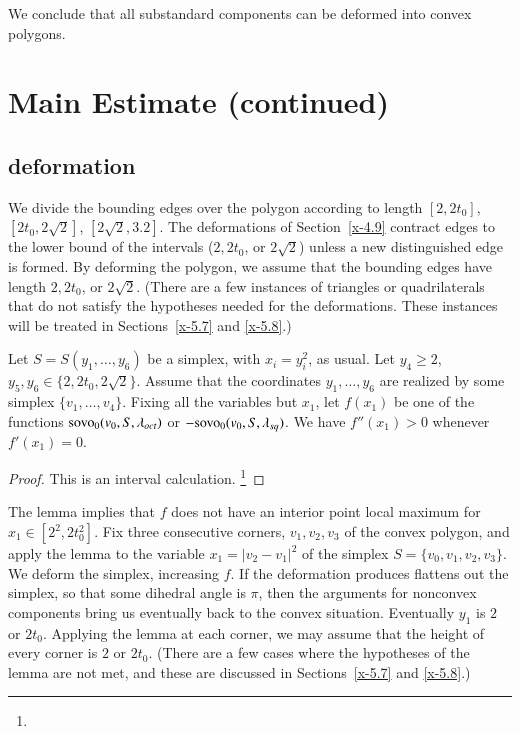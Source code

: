 We conclude that all substandard components can be deformed into convex polygons.





\section{Main Estimate (continued)}%

\subsection{deformation} %
We divide the bounding edges over the polygon according to length
$[2,2t_0]$, $[2t_0,2\sqrt{2}]$, $[2\sqrt{2},3.2]$. The deformations of
Section~\ref{x-4.9} contract edges to the lower bound of the intervals
($2,2t_0$, or $2\sqrt{2}$) unless a new distinguished edge is formed. By
deforming the polygon, we assume that the bounding edges have length
$2,2t_0$, or $2\sqrt{2}$. (There are a few instances of triangles or
quadrilaterals that do not satisfy the hypotheses needed for the
deformations. These instances will be treated in Sections~\ref{x-5.7}
and \ref{x-5.8}.)

\begin{lemma}
Let $S=S(y_1,\ldots,y_6)$ be a simplex, with $x_i=y_i^2$,
as usual.  Let $y_4\ge 2$,
    $y_5,y_6\in\{2,2t_0,2\sqrt{2}\}$.
Assume that the coordinates $y_1,\ldots,y_6$ are realized by
some simplex $\{v_1,\ldots,v_4\}$.  %
Fixing all the variables but $x_1$, let $f(x_1)$ be one of the
functions ${\operatorname{sovo}}_0(v_0,S,\lambda_{oct})$ or 
$-{\operatorname{sovo}}_0(v_0,S,\lambda_{sq})$. We have $f''(x_1)>0$
whenever $f'(x_1)=0$.
\end{lemma}

\begin{proof} This is an interval calculation.%
\footnote{} %
\end{proof}



The lemma implies that $f$ does not have an interior point local maximum
for $x_1\in[2^2,2t_0^2]$.  Fix three consecutive corners, $v_1,v_2,v_3$
of the convex polygon, and apply the lemma to the variable $x_1 =
|v_2-v_1|^2$ of the simplex $S=\{v_0,v_1,v_2,v_3\}$. We deform the simplex,
increasing $f$.  If the deformation produces flattens out the simplex, 
so that some
dihedral angle is $\pi$, then the arguments for nonconvex components bring
us eventually back to the convex situation. Eventually $y_1$ is $2$ or
$2t_0$.  Applying the lemma at each corner, we may assume that the
height of every corner is $2$ or $2t_0$.   (There are a few cases where
the hypotheses of the lemma are not met, and these are discussed in
Sections~\ref{x-5.7} and \ref{x-5.8}.)


